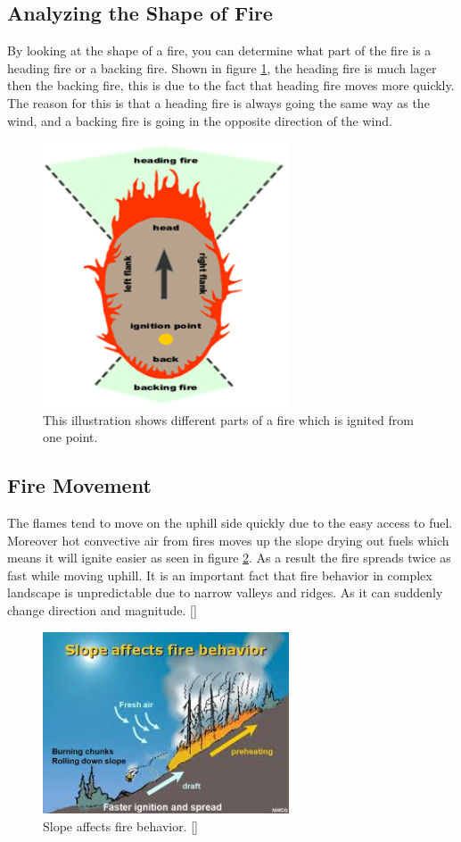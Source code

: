 \subsection{Analyzing the Shape of Fire}
By looking at the shape of a fire, you can determine what part of the fire is a heading fire or a backing fire. Shown in figure \ref{fig:fire-ignition}, the heading fire is much lager then the backing fire, this is due to the fact that heading fire moves more quickly. The reason for this is that a heading fire is always going the same way as the wind, and a backing fire is going in the opposite direction of the wind.
\begin{figure}[here]
  \centering
      \includegraphics[width=0.65\textwidth]{theory/graphics/fire-ignition.png}
  \caption{ This illustration shows different parts of a fire which is ignited from one point. }
  \label{fig:fire-ignition}
\end{figure}
\subsection{Fire Movement}
The flames tend to move on the uphill side quickly due to the easy access to fuel. Moreover hot convective air from fires moves up the slope drying out fuels which means it will ignite easier as seen in figure \ref{fig:fire-slope}. As a result the fire spreads twice as fast while moving uphill. It is an important fact that fire behavior in complex landscape is unpredictable due to narrow valleys and ridges. As it can suddenly change direction and magnitude. []
\begin{figure}[here]
  \centering
      \includegraphics[width=0.65\textwidth]{theory/graphics/fire-slope.jpg}
  \caption{Slope affects fire behavior. [] }
  \label{fig:fire-slope}
\end{figure}
